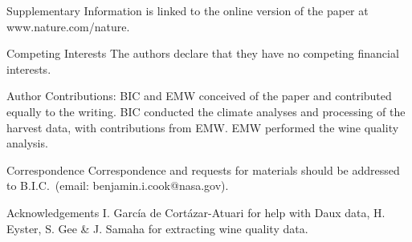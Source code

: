 \documentclass[final]{nature}
\begin{document}
\pagebreak 
\begin{addendum}
 \item [Supplementary Information] is linked to the online version of the paper at www.nature.com/nature.
 \item[Competing Interests] The authors declare that they have no competing financial interests.
\item [Author Contributions:] BIC and EMW conceived of the paper and contributed equally to the writing. BIC conducted the climate analyses and processing of the harvest data, with contributions from EMW. EMW performed the wine quality analysis.
 \item[Correspondence] Correspondence and requests for materials
should be addressed to B.I.C.~(email: benjamin.i.cook@nasa.gov).
 \item[Acknowledgements] I. Garc\'ia de Cort\'azar-Atuari for help with Daux data, H. Eyster, S. Gee \& J. Samaha for extracting wine quality data.
\end{addendum}
\end{document}
